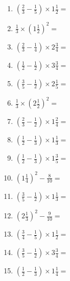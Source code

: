 \documentclass[12pt]{article}
\begin{document}
\begin{enumerate}
\item \large $ \left( \frac{2}{3} - \frac{1}{5} \right) \times 1 \frac{1}{2} = $ \vspace{1.6cm}
\item \large $ \frac{1}{3} \times \left( 1 \frac{1}{2} \right)^2 = $ \vspace{1.6cm}
\item \large $ \left( \frac{2}{3} - \frac{1}{4} \right) \times 2 \frac{3}{4} = $ \vspace{1.6cm}
\item \large $ \left( \frac{1}{2} - \frac{1}{2} \right) \times 3 \frac{3}{4} = $ \vspace{1.6cm}
\item \large $ \left( \frac{3}{5} - \frac{1}{2} \right) \times 2 \frac{1}{5} = $ \vspace{1.6cm}
\newpage
\item \large $ \frac{1}{3} \times \left( 2 \frac{1}{2} \right)^2 = $ \vspace{1.6cm}
\item \large $ \left( \frac{2}{3} - \frac{1}{2} \right) \times 1 \frac{2}{4} = $ \vspace{1.6cm}
\item \large $ \left( \frac{1}{2} - \frac{1}{3} \right) \times 1 \frac{1}{3} = $ \vspace{1.6cm}
\item \large $ \left( \frac{1}{2} - \frac{1}{3} \right) \times 1 \frac{3}{5} = $ \vspace{1.6cm}
\item \large $ \left( 1 \frac{1}{4} \right)^2 - \frac{8}{10} = $ \vspace{1.6cm}
\item \large $ \left( \frac{3}{5} - \frac{1}{2} \right) \times 1 \frac{1}{3} = $ \vspace{1.6cm}
\item \large $ \left( 2 \frac{1}{3} \right)^2 - \frac{9}{10} = $ \vspace{1.6cm}
\item \large $ \left( \frac{3}{4} - \frac{1}{5} \right) \times 1 \frac{1}{2} = $ \vspace{1.6cm}
\item \large $ \left( \frac{3}{5} - \frac{1}{2} \right) \times 3 \frac{3}{4} = $ \vspace{1.6cm}
\item \large $ \left( \frac{1}{2} - \frac{1}{3} \right) \times 1 \frac{1}{4} = $ \vspace{1.6cm}
\newpage

\end{enumerate}
\end{document}
